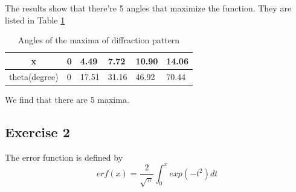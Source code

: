 \documentclass{article}
\begin{document}
The results show that there're 5 angles that maximize the function. They are listed in Table \ref{t1} 
\begin{table}
\begin{center}
\begin{tabular}{| c | l | l | l | l | l |}
\hline
x         & 0       &4.49     & 7.72      & 10.90    & 14.06   \\ \hline
theta(degree)   & 0       &17.51   & 31.16    &  46.92   & 70.44   \\ \hline                                
\end{tabular}
\caption {Angles of the maxima of diffraction pattern} \label{t1}
\end{center}
\end{table}
We find that there are 5 maxima.
 

\subsection{Exercise 2}

The error function is defined by
\begin{equation}
erf(x) = \frac{2}{\sqrt{\pi}}\int_{0}^{x} exp(-t^2)dt
\end{equation}
\end{document}

